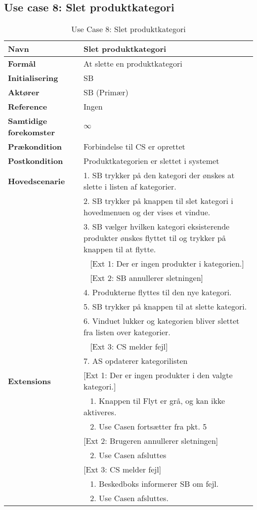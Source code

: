 \subsection{Use case 8: Slet produktkategori}

\begin{table}[H]
\begin{tabularx}{\textwidth}{|l|X|}
\hline
\textbf{Navn}					& Slet produktkategori \\\hline
\textbf{Formål}					& At slette en produktkategori \\\hline
\textbf{Initialisering}			& \gls{SB} \\\hline
\textbf{Aktører}				& \gls{SB} (Primær)\\\hline
\textbf{Reference}				& Ingen \\\hline
								
\textbf{Samtidige forekomster}	& $\infty$ \\\hline
\textbf{Prækondition}			& Forbindelse til \gls{CS} er oprettet \\\hline
\textbf{Postkondition}			& Produktkategorien er slettet i systemet \\\hline

\textbf{Hovedscenarie}			& 1. \gls{SB} trykker på den kategori der ønskes at slette i listen af kategorier. \\		
								& 2. \gls{SB} trykker på knappen til slet kategori i hovedmenuen og der vises et vindue.\\
								& 3. \gls{SB} vælger hvilken kategori eksisterende produkter ønskes flyttet til og trykker på knappen til at flytte.\\
								& ~ [Ext 1: Der er ingen produkter i kategorien.]\\
								& ~ [Ext 2: \gls{SB} annullerer sletningen]\\
								& 4. Produkterne flyttes til den nye kategori.\\
								& 5. \gls{SB} trykker på knappen til at slette kategori.\\
								& 6. Vinduet lukker og kategorien bliver slettet fra listen over kategorier.\\
								& ~ [Ext 3: \gls{CS} melder fejl]\\
								& 7. \gls{AS} opdaterer kategorilisten \\\hline

\textbf{Extensions}							
  								& [Ext 1: Der er ingen produkter i den valgte kategori.] \\
  								& ~ 1. Knappen til Flyt er grå, og kan ikke aktiveres.\\
  								& ~ 2. Use Casen fortsætter fra pkt. 5\\
  								& [Ext 2: Brugeren annullerer sletningen]\\
  								& ~ 2. Use Casen afsluttes \\
								
								& [Ext 3: \gls{CS} melder fejl]\\
								& ~ 1. Beskedboks informerer \gls{SB} om fejl.\\
								& ~ 2. Use Casen afsluttes.\\\hline
\end{tabularx}
\caption{Use Case 8: Slet produktkategori}
\label{tab:UCspk}
\end{table}